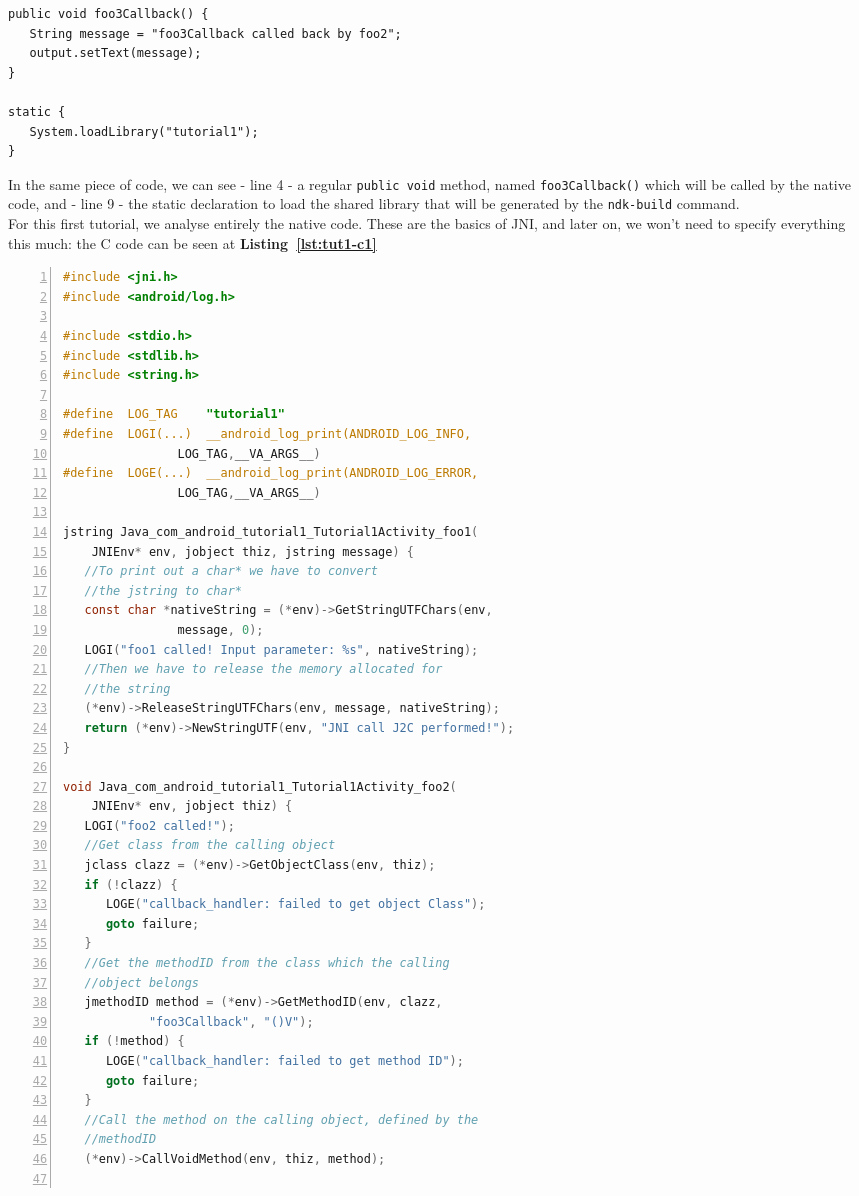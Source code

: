 \documentclass[a4paper,10pt]{article}
\newcommand{\keyword}[1]{\texttt{#1}}
\newcommand{\refl}[1]{\textbf{Listing~\ref{#1}}}
\begin{document}
\begin{multicols}{2}
\begin{lstlisting}
public void foo3Callback() {
   String message = "foo3Callback called back by foo2";
   output.setText(message);
}
  
static {
   System.loadLibrary("tutorial1");
}
\end{lstlisting}
In the same piece of code, we can see - line 4 - a regular \keyword{public void} method, named \keyword{foo3Callback()} which will be called by the native code, and - line 9 - the static declaration to load the shared library that will be generated by the \keyword{ndk-build} command.\\
For this first tutorial, we analyse entirely the native code. These are the basics of JNI, and later on, we won't need to specify everything this much: the C code can be seen at \refl{lst:tut1-c1}

\begin{lstlisting}[language=C,
				   columns=fullflexible,
				   showstringspaces=false,
				   xleftmargin=15pt,
				   frame = l,
				   numbers=left,
				   commentstyle=\color{gray}\upshape,
				   caption=tutorial1.c,
				   label=lst:tut1-c1]
#include <jni.h>
#include <android/log.h>

#include <stdio.h>
#include <stdlib.h>
#include <string.h>

#define  LOG_TAG    "tutorial1"
#define  LOGI(...)  __android_log_print(ANDROID_LOG_INFO,
				LOG_TAG,__VA_ARGS__)
#define  LOGE(...)  __android_log_print(ANDROID_LOG_ERROR,
				LOG_TAG,__VA_ARGS__)

jstring Java_com_android_tutorial1_Tutorial1Activity_foo1(
	JNIEnv* env, jobject thiz, jstring message) {
   //To print out a char* we have to convert
   //the jstring to char*
   const char *nativeString = (*env)->GetStringUTFChars(env,
				message, 0);
   LOGI("foo1 called! Input parameter: %s", nativeString);
   //Then we have to release the memory allocated for
   //the string
   (*env)->ReleaseStringUTFChars(env, message, nativeString);
   return (*env)->NewStringUTF(env, "JNI call J2C performed!");
}

void Java_com_android_tutorial1_Tutorial1Activity_foo2(
	JNIEnv* env, jobject thiz) {
   LOGI("foo2 called!");
   //Get class from the calling object
   jclass clazz = (*env)->GetObjectClass(env, thiz);
   if (!clazz) {
      LOGE("callback_handler: failed to get object Class");
      goto failure;
   }
   //Get the methodID from the class which the calling
   //object belongs
   jmethodID method = (*env)->GetMethodID(env, clazz,
   			"foo3Callback", "()V");
   if (!method) {
      LOGE("callback_handler: failed to get method ID");
      goto failure;
   }
   //Call the method on the calling object, defined by the
   //methodID
   (*env)->CallVoidMethod(env, thiz, method);


\end{lstlisting}
\end{multicols}
\end{document}
